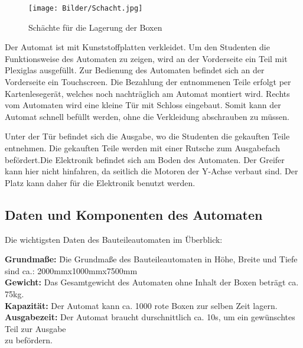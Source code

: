 \documentclass{scrartcl}
\begin{document}
\begin{figure}
  \centering
     \texttt{[image: Bilder/Schacht.jpg]}
			\caption{Schächte für die Lagerung der Boxen}
  \label{fig:Bild1}
\end{figure}

Der Automat ist mit Kunststoffplatten verkleidet. Um den Studenten die Funktionsweise des Automaten zu zeigen, wird an der 
Vorderseite ein Teil mit Plexiglas ausgefüllt. Zur Bedienung des Automaten befindet sich an der Vorderseite ein Touchscreen.  Die Bezahlung der entnommenen Teile erfolgt per Kartenlesegerät, welches noch nachträglich am Automat montiert wird. Rechts vom Automaten wird eine kleine Tür mit Schloss eingebaut. Somit kann der Automat schnell befüllt werden, ohne die Verkleidung abschrauben zu müssen. 

Unter der Tür befindet sich die Ausgabe, wo die Studenten die gekauften Teile entnehmen. Die gekauften Teile werden mit einer Rutsche zum Ausgabefach befördert.Die Elektronik befindet sich am Boden des Automaten. Der Greifer kann hier nicht hinfahren, da seitlich die Motoren der Y-Achse verbaut sind. Der Platz kann daher für die Elektronik benutzt werden.




\newpage
\subsection{Daten und Komponenten des Automaten}

Die wichtigsten Daten des Bauteileautomaten im Überblick:

\begin{tabbing}
\textbf{Grundmaße:} \quad    \=Die Grundmaße des Bauteileautomaten in Höhe, Breite und Tiefe\\
											  \>sind ca.: 2000mmx1000mmx7500mm\\
\textbf{Gewicht:}			  \>Das Gesamtgewicht des Automaten ohne Inhalt der Boxen beträgt ca. 75kg.\\
\textbf{Kapazität:}		  \>Der Automat kann ca. 1000 rote Boxen zur selben Zeit lagern.\\
\textbf{Ausgabezeit:}	  \>Der Automat braucht durschnittlich ca. 10s, um ein gewünschtes Teil zur Ausgabe\\
												\>zu befördern.\\

\end{tabbing}
\end{document}
